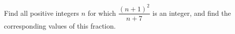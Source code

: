 Find all positive integers $n$ for which $\dfrac{(n+1)^2}{n+7}$ is an integer, and find the corresponding values of this fraction.
